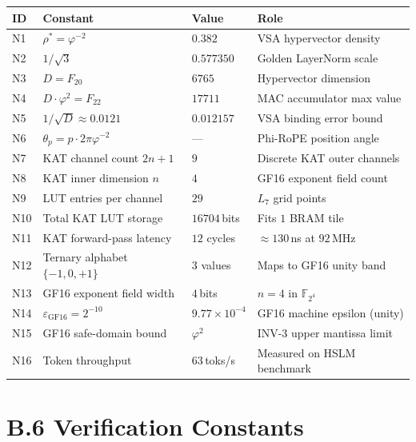 \begin{longtable}[]{@{}llll@{}}
\toprule\noalign{}
ID & Constant & Value & Role \\
\midrule\noalign{}
\endhead
\bottomrule\noalign{}
\endlastfoot
N1 & $\rho^* = \varphi^{-2}$ & $0.382$ & VSA hypervector density \\
N2 & $1/\sqrt{3}$ & $0.577350$ & Golden LayerNorm scale \\
N3 & $D = F_{20}$ & $6765$ & Hypervector dimension \\
N4 & $D \cdot \varphi^2 = F_{22}$ & $17711$ & MAC accumulator max value \\
N5 & $1/\sqrt{D} \approx 0.0121$ & $0.012157$ & VSA binding error bound \\
N6 & $\theta_p = p \cdot 2\pi \varphi^{-2}$ & --- & Phi-RoPE position angle \\
N7 & KAT channel count $2n+1$ & $9$ & Discrete KAT outer channels \\
N8 & KAT inner dimension $n$ & $4$ & GF16 exponent field count \\
N9 & LUT entries per channel & $29$ & $L_7$ grid points \\
N10 & Total KAT LUT storage & $16704$\,bits & Fits $1$ BRAM tile \\
N11 & KAT forward-pass latency & $12$ cycles & $\approx 130$\,ns at $92$\,MHz \\
N12 & Ternary alphabet $\{-1,0,+1\}$ & $3$ values & Maps to GF16 unity band \\
N13 & GF16 exponent field width & $4$\,bits & $n = 4$ in $\mathbb{F}_{2^4}$ \\
N14 & $\varepsilon_{\mathrm{GF16}} = 2^{-10}$ & $9.77 \times 10^{-4}$ & GF16 machine epsilon (unity) \\
N15 & GF16 safe-domain bound & $\varphi^2$ & INV-3 upper mantissa limit \\
N16 & Token throughput & $63$\,toks/s & Measured on HSLM benchmark \\
\end{longtable}

\section*{B.6 Verification Constants}
\label{app:B-verification}

